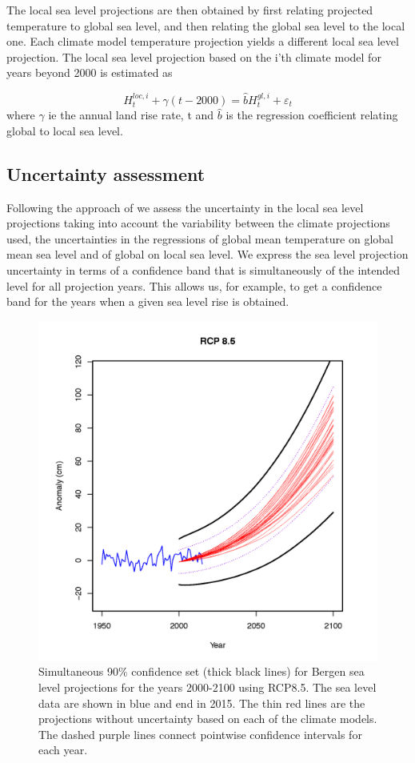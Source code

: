\documentclass[wrr, draft]{agutex}
\begin{document}
\begin{article}
The local sea level projections are then obtained by first relating projected temperature to global sea level, and then relating the global sea level to the local one. Each climate model temperature projection yields a different local sea level projection. The local sea level projection based on the i'th climate model for years beyond 2000 is estimated as

\[H_t^{loc,i} + \gamma (t -2000 ) = {\hat b} H_t^{gl,i}  + {\varepsilon _t}\]
where $\gamma$ ie the annual land rise rate, t and $ {\hat b} $ is the regression coefficient relating global to local sea level.



\subsection{Uncertainty assessment}
\label{unc_ass}
Following the approach of \citet{Guttorp2014} we assess the uncertainty in the local sea level projections taking into account the variability between the climate projections used, the uncertainties in the regressions of global mean temperature on global mean sea level and of global on local sea level. We express the sea level projection uncertainty in terms of a confidence band that is simultaneously of the intended  level  for all projection years. This allows us, for example, to get a confidence band for the years when a given sea level rise is obtained. 
\begin{figure}
\begin{center}
\includegraphics[width=39pc]{bergen_ci.png}
\caption{Simultaneous 90\% confidence set (thick black lines) for Bergen sea level projections for the years 2000-2100 using RCP8.5. The sea level data are shown in blue and end in 2015. The thin red lines are the projections without uncertainty based on each of the climate models. The dashed purple lines connect pointwise confidence intervals for each year. }
\label{fig:ci}
\end{center}
\end{figure}



\end{article}
\end{document}
